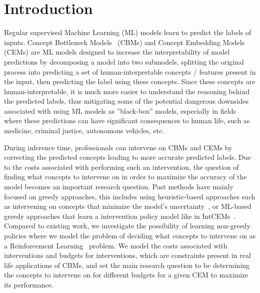 \documentclass[../main.tex]{subfiles}
\begin{document}
\chapter{Introduction}
\label{firstcontentpage}


Regular supervised Machine Learning (ML) models learn to 
predict the labels of inputs.
Concept Bottleneck Models~\cite{cbm} (CBMs) and Concept Embedding Models~\cite{cem} (CEMs) are 
ML models designed to increase the interpretability of model predictions by decomposing a model into
two submodels, splitting the original process into predicting a set of human-interpretable
concepts / features present in the input, then predicting the label using these concepts.
Since these concepts are human-interpretable, it is much more easier to understand
the reasoning behind the predicted labels, thus mitigating some of the
potential dangerous downsides associated with using ML models as ''black-box'' models,
especially in fields where these predictions can have significant consequences to
human life, such as medicine, criminal justice, autonomous vehicles, etc. 

During inference time, professionals can intervene on CBMs and CEMs by correcting
the predicted concepts leading to more accurate predicted labels. 
Due to the costs
associated with performing such an intervention, the question of finding what concepts
to intervene on in order to maximize the accuracy of the model becomes an important 
research question. Past methods have mainly focused on greedy approaches, this
includes using heuristic-based approaches such as intervening on concepts that minimize the
model's uncertainty~\cite{coop}, or ML-based greedy approaches that learn a intervention policy model
like in IntCEMs~\cite{intcem}.
Compared to existing work, we investigate the possibility of learning non-greedy policies
where we model the problem of deciding what concepts to intervene on as a Reinforcement Learning~\cite{rl} 
problem. We model the costs
associated with interventions and budgets for interventions, which are constraints present in
 real life
applications of CBMs, and set the main research question to be
determining the concepts to intervene on for different budgets for a given CEM
to maximize its performance.
\end{document}
